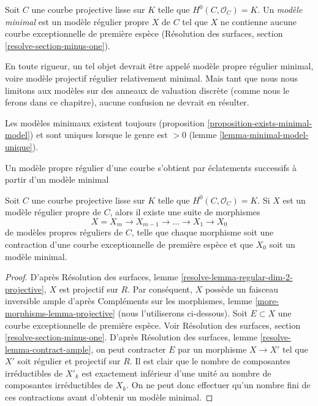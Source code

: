 \begin{definition}
\label{definition-minimal-model}
Soit $C$ une courbe projective lisse sur $K$ telle que
$H^0(C, \mathcal{O}_C) = K$. Un {\it modèle minimal}
est un modèle régulier propre $X$ de $C$ tel que
$X$ ne contienne aucune courbe exceptionnelle de première espèce
(Résolution des surfaces, section \ref{resolve-section-minus-one}).
\end{definition}

\noindent
En toute rigueur, un tel objet devrait être appelé modèle propre régulier minimal,
voire modèle projectif régulier relativement minimal. Mais tant que
nous nous limitons aux modèles sur des anneaux de valuation discrète (comme nous le ferons
dans ce chapitre), aucune confusion ne devrait en résulter.

\medskip\noindent
Les modèles minimaux existent toujours
(proposition \ref{proposition-exists-minimal-model}) et sont uniques
lorsque le genre est $> 0$ (lemme \ref{lemma-minimal-model-unique}).

\begin{lemma}
\label{lemma-pre-exists-minimal-model}
\begin{slogan}
Un modèle propre régulier d'une courbe s'obtient par éclatements successifs
à partir d'un modèle minimal
\end{slogan}
Soit $C$ une courbe projective lisse sur $K$ telle que
$H^0(C, \mathcal{O}_C) = K$. Si $X$ est un modèle régulier propre
de $C$, alors il existe une suite de morphismes
$$
X = X_m \to X_{m - 1} \to \ldots \to X_1 \to X_0
$$
de modèles propres réguliers de $C$, telle que chaque morphisme soit une
contraction d'une courbe exceptionnelle de première espèce et que
$X_0$ soit un modèle minimal.
\end{lemma}

\begin{proof}
D'après Résolution des surfaces, lemme \ref{resolve-lemma-regular-dim-2-projective},
$X$ est projectif sur $R$. Par conséquent, $X$ possède un faisceau inversible
ample d'après
Compléments sur les morphismes, lemme \ref{more-morphisms-lemma-projective}
(nous l'utiliserons ci-dessous).
Soit $E \subset X$ une courbe exceptionnelle de première espèce.
Voir Résolution des surfaces, section \ref{resolve-section-minus-one}.
D'après Résolution des surfaces, lemme \ref{resolve-lemma-contract-ample},
on peut contracter $E$ par un morphisme $X \to X'$ tel que $X'$ soit
régulier et projectif sur $R$. Il est clair que le nombre de
composantes irréductibles de $X'_k$ est exactement inférieur d'une unité au
nombre de composantes irréductibles de $X_k$. On ne peut donc
effectuer qu'un nombre fini de ces contractions avant
d'obtenir un modèle minimal.
\end{proof}

